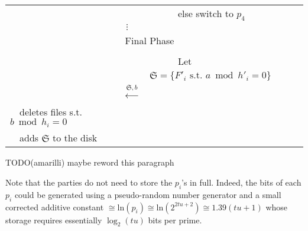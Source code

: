 \documentclass[11pt]{llncs}
\begin{document}
\begin{center}
\begin{tabular}{|lcl|}
                                   &                                                      &~~~~~~else switch to $p_4$ ~~\\
                                   &                  $\vdots$                            & \\\hline\hline
\multicolumn{3}{|c|}{{\sf Final Phase~~}} \\\hline
                                   &                                                      & \\
                                   &                                                      &~~~~~~Let $\mathfrak{S}=\{F'_i \mbox{~s.t.~} a \bmod h'_i =0\}$~~\\
                                   &~~{\LARGE $\stackrel{\mathfrak{S},b}{\longleftarrow}$}&\\
                                   ~~deletes files s.t. $b \bmod h_i =0$&                                                      &\\
                                   ~~adds $\mathfrak{S}$ to the disk    &                                                      &\\\hline
\end{tabular}
\end{center}

TODO(amarilli) maybe reword this paragraph

Note that the parties do not need to store the $p_i$'s in full. Indeed, the bits of each $p_i$ could be generated using a pseudo-random number generator and a small corrected additive constant
$ \cong \mbox{ln}(p_i) \cong \mbox{ln}(2^{2tu+2}) \cong 1.39(tu+1)$ whose storage requires essentially $\log_2(tu)$ bits per prime.
\end{document}
